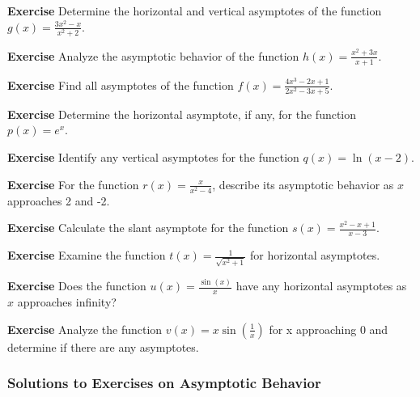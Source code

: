 \documentclass[a4paper,12pt]{book}
\newenvironment{exercise}[1][]
  {\par\medskip\noindent\textbf{Exercise #1} \rmfamily}
  {\medskip}
\begin{document}
\begin{exercise}
Determine the horizontal and vertical asymptotes of the function \( g(x) = \frac{3x^2 - x}{x^2 + 2} \).
\end{exercise}

\begin{exercise}
Analyze the asymptotic behavior of the function \( h(x) = \frac{x^2 + 3x}{x + 1} \).
\end{exercise}

\begin{exercise}
Find all asymptotes of the function \( f(x) = \frac{4x^3 - 2x + 1}{2x^2 - 3x + 5} \).
\end{exercise}

\begin{exercise}
Determine the horizontal asymptote, if any, for the function \( p(x) = e^x \).
\end{exercise}

\begin{exercise}
Identify any vertical asymptotes for the function \( q(x) = \ln(x - 2) \).
\end{exercise}

\begin{exercise}
For the function \( r(x) = \frac{x}{x^2 - 4} \), describe its asymptotic behavior as \( x \) approaches 2 and -2.
\end{exercise}

\begin{exercise}
Calculate the slant asymptote for the function \( s(x) = \frac{x^2 - x + 1}{x - 3} \).
\end{exercise}

\begin{exercise}
Examine the function \( t(x) = \frac{1}{\sqrt{x^2 + 1}} \) for horizontal asymptotes.
\end{exercise}

\begin{exercise}
Does the function \( u(x) = \frac{\sin(x)}{x} \) have any horizontal asymptotes as \( x \) approaches infinity?
\end{exercise}

\begin{exercise}
Analyze the function \( v(x) = x\sin(\frac{1}{x}) \) for x approaching 0 and determine if there are any asymptotes.
\end{exercise}

\subsubsection*{Solutions to Exercises on Asymptotic Behavior}
\end{document}
